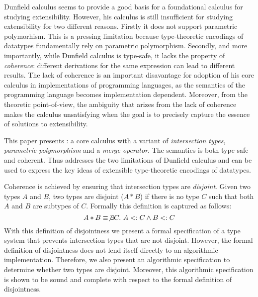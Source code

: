 
Dunfield calculus seems to provide a good basis for a foundational
calculus for studying extensibility.  However, his calculus is still
insufficient for studying extensibility for two different reasons.  Firstly it does not
support parametric polymorhism. This is a pressing limitation because
type-theoretic encodings of datatypes fundamentally rely on parametric
polymorphism.  Secondly, and more importantly, while Dunfield calculus
is type-safe, it lacks the property of \emph{coherence}: different
derivations for the same expression can lead to different results. The
lack of coherence is an important disavantage for adoption of his core
calculus in implementations of programming languages, as the semantics
of the programming language becomes implementation dependent.
Moreover, from the theoretic point-of-view, the ambiguity that arizes
from the lack of coherence makes the calculus unsatisfying when the
goal is to precisely capture the essence of solutions to
extensibility.

This paper presents \namedis: a core calculus with a variant of
\emph{intersection types}, \emph{parametric polymorphism} and a
\emph{merge operator}. The semantics \namedis is both type-safe and
coherent. Thus \namedis addresses the two limitations of Dunfield
calculus and can be used to express the key ideas of extensible
type-theoretic encodings of datatypes.

Coherence is achieved by ensuring that intersection types are
\emph{disjoint}. Given two types $A$ and $B$, two types are disjoint
($A * B$)
if there is no type $C$ such that both $A$ and $B$ are
subtypes of $C$. Formally this definition is captured as follows:
\[A * B \equiv \not\exists C.~A <: C \wedge B <: C\]
With this definition of disjointness we present a formal specification
of a type system that prevents intersection types that are not
disjoint.  However, the formal definition of disjointness does
not lend itself directly to an algorithmic implementation. Therefore,
we also present an algorithmic specification to determine whether two
types are disjoint. Moreover, this algorithmic specification is shown to be
sound and complete with respect to the formal definition of
disjointness.

